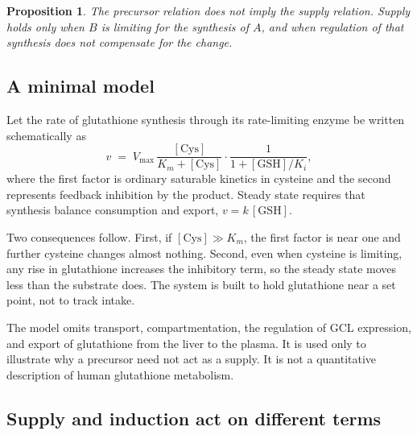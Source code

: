 \documentclass[11pt,a4paper]{article}
\theoremstyle{plain}
\newtheorem{proposition}{Proposition}
\theoremstyle{definition}
\theoremstyle{remark}
\newcommand{\GSH}{\mathrm{GSH}}
\begin{document}
\begin{proposition}
The precursor relation does not imply the supply relation. Supply holds only when $B$ is limiting for the synthesis of $A$, and when regulation of that synthesis does not compensate for the change.
\end{proposition}

\subsection{A minimal model}

Let the rate of glutathione synthesis through its rate-limiting enzyme be written schematically as
\[
v \;=\; V_{\max}\,\frac{[\mathrm{Cys}]}{K_m + [\mathrm{Cys}]}\cdot\frac{1}{1 + [\GSH]/K_i},
\]
where the first factor is ordinary saturable kinetics in cysteine and the second represents feedback inhibition by the product. Steady state requires that synthesis balance consumption and export, $v = k\,[\GSH]$.

Two consequences follow. First, if $[\mathrm{Cys}] \gg K_m$, the first factor is near one and further cysteine changes almost nothing. Second, even when cysteine is limiting, any rise in glutathione increases the inhibitory term, so the steady state moves less than the substrate does. The system is built to hold glutathione near a set point, not to track intake.

\begin{caution}
The model omits transport, compartmentation, the regulation of GCL expression, and export of glutathione from the liver to the plasma. It is used only to illustrate why a precursor need not act as a supply. It is not a quantitative description of human glutathione metabolism.
\end{caution}

\subsection{Supply and induction act on different terms}
\end{document}
